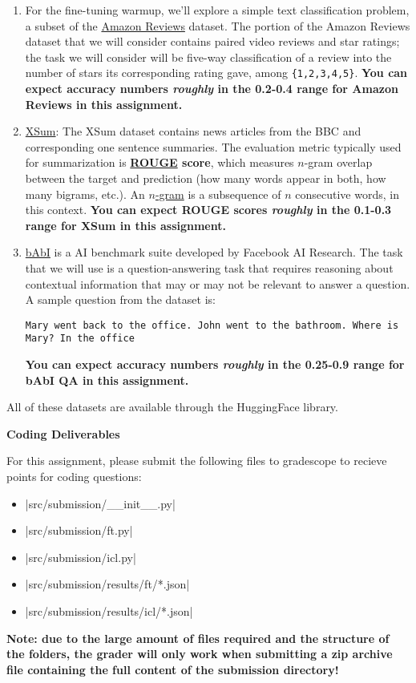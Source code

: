 \begin{enumerate}
    \item For the fine-tuning warmup, we'll explore a simple text classification problem, a subset of the \href{https://huggingface.co/datasets/amazon\_us\_reviews}{Amazon Reviews} dataset. The portion of the Amazon Reviews dataset that we will consider contains paired video reviews and star ratings; the task we will consider will be five-way classification of a review into the number of stars its corresponding rating gave, among \texttt{\{1,2,3,4,5\}}. \textbf{You can expect accuracy numbers \textit{roughly} in the 0.2-0.4 range for Amazon Reviews in this assignment.}
    \item \href{https://huggingface.co/datasets/xsum}{XSum}: The XSum dataset contains news articles from the BBC and corresponding one sentence summaries. The evaluation metric typically used for summarization is \textbf{\href{https://en.wikipedia.org/wiki/ROUGE_(metric)}{ROUGE} score}, which measures $n$-gram overlap between the target and prediction (how many words appear in both, how many bigrams, etc.). An \href{https://en.wikipedia.org/wiki/N-gram#Examples}{$n$-gram} is a subsequence of $n$ consecutive words, in this context.  \textbf{You can expect ROUGE scores \textit{roughly} in the 0.1-0.3 range for XSum in this assignment.}
    \item \href{https://research.facebook.com/downloads/babi/}{bAbI} is a AI benchmark suite developed by Facebook AI Research. The task that we will use is a question-answering task that requires reasoning about contextual information that may or may not be relevant to answer a question. A sample question from the dataset is:
    
    \texttt{Mary went back to the office. John went to the bathroom. Where is Mary? In the office}
    
    \textbf{You can expect accuracy numbers \textit{roughly} in the 0.25-0.9 range for bAbI QA in this assignment.}
\end{enumerate}

All of these datasets are available through the HuggingFace library.

\clearpage

\textbf{Coding Deliverables}

For this assignment, please submit the following files to gradescope to recieve points for coding questions:
\begin{itemize}
    \item |src/submission/__init__.py|
    \item |src/submission/ft.py|
    \item |src/submission/icl.py|
    \item |src/submission/results/ft/*.json|
    \item |src/submission/results/icl/*.json|
\end{itemize}

\textbf{Note: due to the large amount of files required and the structure of the folders, the grader will only work when submitting a zip archive file containing the full content of the submission directory!}